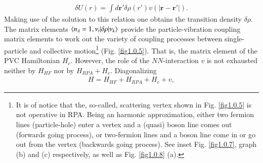\begin{align}\label{eq1.0.19}
\delta U(r)=\int d\mathbf r' \delta \rho(r')v\left(|\mathbf r-\mathbf r'|\right).
\end{align}
Making use  of the solution to this relation  one obtains the transition density $\delta\rho$. The matrix elements $\langle {n_\lambda=1, \nu_i|\delta\rho|\nu_k} \rangle$ provide the  particle-vibration coupling matrix elements to work out the variety of coupling processes between single-particle and collective motion\footnote{It is of notice that the, so-called, scattering vertex shown in Fig. \ref{fig1.0.5} is not operative in RPA. Being an harmonic approximation, either two fermion lines (particle-hole) enter a vertex and a (quasi) boson line comes out (forwards going process), or two-fermion lines and a boson line come in or go out from the vertex (backwards going process). See inset Fig. \ref{fig1.0.7}, graph (b) and (c) respectively, as well as Fig. \ref{fig1.0.8} (a).} (Fig. \ref{fig1.0.5}). That is, the matrix element of the PVC Hamiltonian $H_c$. However, the role of the $NN$-interaction $v$ is not exhausted neither by $H_{HF}$ nor by $H_{RPA}+H_c$. Diagonalizing 
\begin{align}\label{eq1.0.19b}
H=H_{HF}+H_{RPA}+H_c+v,
\end{align}
